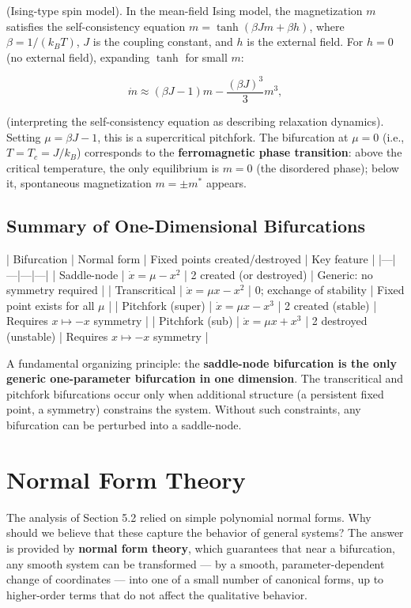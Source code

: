 \begin{example}
(Ising-type spin model). In the mean-field Ising model, the magnetization $m$ satisfies the self-consistency equation $m = \tanh(\beta J m + \beta h)$, where $\beta = 1/(k_B T)$, $J$ is the coupling constant, and $h$ is the external field. For $h = 0$ (no external field), expanding $\tanh$ for small $m$:

\[
\dot{m} \approx (\beta J - 1)m - \frac{(\beta J)^3}{3}m^3,
\]

(interpreting the self-consistency equation as describing relaxation dynamics). Setting $\mu = \beta J - 1$, this is a supercritical pitchfork. The bifurcation at $\mu = 0$ (i.e., $T = T_c = J/k_B$) corresponds to the \textbf{ferromagnetic phase transition}: above the critical temperature, the only equilibrium is $m = 0$ (the disordered phase); below it, spontaneous magnetization $m = \pm m^*$ appears.
\end{example}


\subsection{Summary of One-Dimensional Bifurcations}\label{sec:5.2.4}

| Bifurcation | Normal form | Fixed points created/destroyed | Key feature |
|---|---|---|---|
| Saddle-node | $\dot{x} = \mu - x^2$ | 2 created (or destroyed) | Generic: no symmetry required |
| Transcritical | $\dot{x} = \mu x - x^2$ | 0; exchange of stability | Fixed point exists for all $\mu$ |
| Pitchfork (super) | $\dot{x} = \mu x - x^3$ | 2 created (stable) | Requires $x \mapsto -x$ symmetry |
| Pitchfork (sub) | $\dot{x} = \mu x + x^3$ | 2 destroyed (unstable) | Requires $x \mapsto -x$ symmetry |

A fundamental organizing principle: the \textbf{saddle-node bifurcation is the only generic one-parameter bifurcation in one dimension}. The transcritical and pitchfork bifurcations occur only when additional structure (a persistent fixed point, a symmetry) constrains the system. Without such constraints, any bifurcation can be perturbed into a saddle-node.


\bigskip


\section{Normal Form Theory}\label{sec:5.3}

The analysis of Section 5.2 relied on simple polynomial normal forms. Why should we believe that these capture the behavior of general systems? The answer is provided by \textbf{normal form theory}, which guarantees that near a bifurcation, any smooth system can be transformed --- by a smooth, parameter-dependent change of coordinates --- into one of a small number of canonical forms, up to higher-order terms that do not affect the qualitative behavior.

